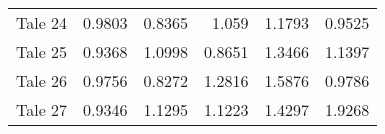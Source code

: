 \begin{table}[h]
\begin{tabular}{lrrrrr}
 Tale 24 &                        0.9803 &                      0.8365 &                        1.059  &                          1.1793 &                         0.9525 \\
 Tale 25 &                        0.9368 &                      1.0998 &                        0.8651 &                          1.3466 &                         1.1397 \\
 Tale 26 &                        0.9756 &                      0.8272 &                        1.2816 &                          1.5876 &                         0.9786 \\
 Tale 27 &                        0.9346 &                      1.1295 &                        1.1223 &                          1.4297 &                         1.9268 \\
\bottomrule
\end{tabular}
\end{table}